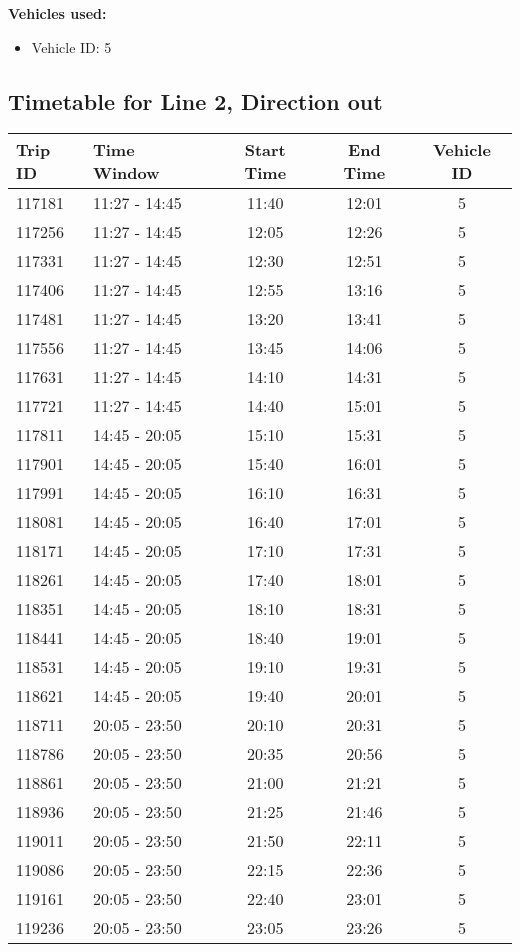 \documentclass{article}
\begin{document}
\textbf{Vehicles used:}
\begin{itemize}
  \item Vehicle ID: 5
\end{itemize}

\subsection*{Timetable for Line 2, Direction out}
\begin{tabular}{llccc}
\toprule
Trip ID & Time Window & Start Time & End Time & Vehicle ID \\
\midrule
117181 & 11:27 - 14:45 & 11:40 & 12:01 & 5 \\
117256 & 11:27 - 14:45 & 12:05 & 12:26 & 5 \\
117331 & 11:27 - 14:45 & 12:30 & 12:51 & 5 \\
117406 & 11:27 - 14:45 & 12:55 & 13:16 & 5 \\
117481 & 11:27 - 14:45 & 13:20 & 13:41 & 5 \\
117556 & 11:27 - 14:45 & 13:45 & 14:06 & 5 \\
117631 & 11:27 - 14:45 & 14:10 & 14:31 & 5 \\
117721 & 11:27 - 14:45 & 14:40 & 15:01 & 5 \\
117811 & 14:45 - 20:05 & 15:10 & 15:31 & 5 \\
117901 & 14:45 - 20:05 & 15:40 & 16:01 & 5 \\
117991 & 14:45 - 20:05 & 16:10 & 16:31 & 5 \\
118081 & 14:45 - 20:05 & 16:40 & 17:01 & 5 \\
118171 & 14:45 - 20:05 & 17:10 & 17:31 & 5 \\
118261 & 14:45 - 20:05 & 17:40 & 18:01 & 5 \\
118351 & 14:45 - 20:05 & 18:10 & 18:31 & 5 \\
118441 & 14:45 - 20:05 & 18:40 & 19:01 & 5 \\
118531 & 14:45 - 20:05 & 19:10 & 19:31 & 5 \\
118621 & 14:45 - 20:05 & 19:40 & 20:01 & 5 \\
118711 & 20:05 - 23:50 & 20:10 & 20:31 & 5 \\
118786 & 20:05 - 23:50 & 20:35 & 20:56 & 5 \\
118861 & 20:05 - 23:50 & 21:00 & 21:21 & 5 \\
118936 & 20:05 - 23:50 & 21:25 & 21:46 & 5 \\
119011 & 20:05 - 23:50 & 21:50 & 22:11 & 5 \\
119086 & 20:05 - 23:50 & 22:15 & 22:36 & 5 \\
119161 & 20:05 - 23:50 & 22:40 & 23:01 & 5 \\
119236 & 20:05 - 23:50 & 23:05 & 23:26 & 5 \\
\bottomrule
\end{tabular}
\end{document}
